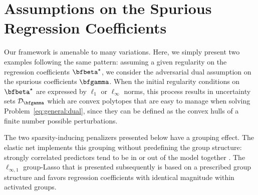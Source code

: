 %  


\section{Assumptions on the Spurious Regression Coefficients \label{sec:quadra}}
\label{sec:gammaperturb}

Our framework is amenable to many variations.
Here, we simply present two examples following the same pattern:
assuming a given regularity on the regression coefficients $\bfbeta^\star$, we
consider the adversarial dual assumption on the spurious coefficients
$\bfgamma$.
When the initial regularity conditions on $\bfbeta^\star$ are expressed by
$\ell_1$ or $\ell_\infty$ norms, this process results in uncertainty sets
$\mathcal{D}_{\bfgamma}$ which are convex polytopes that are
easy to manage when solving Problem~\eqref{eq:general:dual}, since they
can be defined as the convex hulls of a finite number possible perturbations.

The two sparsity-inducing penalizers presented below have a grouping effect.
The elastic net implements this grouping without predefining the group
structure: strongly correlated predictors tend to be in or out of the model
together \citep{2005_JRSS_Zou}.  
The $\ell_{\infty,1}$ group-Lasso that is presented subsequently is based on a
prescribed group structure and favors regression coefficients with identical
magnitude within activated groups.

 

% 



%




%
